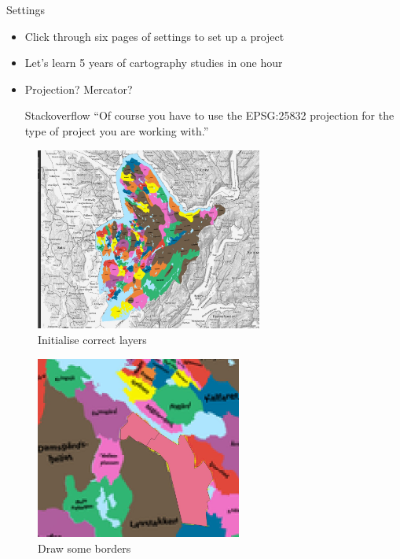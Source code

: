 \begin{frame}{Settings}
    \begin{itemize}[<+->]
        \item Click through six pages of settings to set up a project
        \item Let's learn 5 years of cartography studies in one hour
        \item Projection? Mercator?
        \pause
        \begin{block}{Stackoverflow}
            \enquote{Of course you have to use the EPSG:25832 projection for the type of project you are working with.}
        \end{block}
    \end{itemize}
\end{frame}

\begin{frame}
    \begin{figure}
        \centering
        \includegraphics[height = 6cm]{images/qgis1.jpg}%
        \caption{Initialise correct layers}
    \end{figure}
\end{frame}

\begin{frame}
    \begin{figure}
        \centering
        \includegraphics[height = 6cm]{images/qgis2.png}%
        \caption{Draw some borders}
    \end{figure}
\end{frame}

